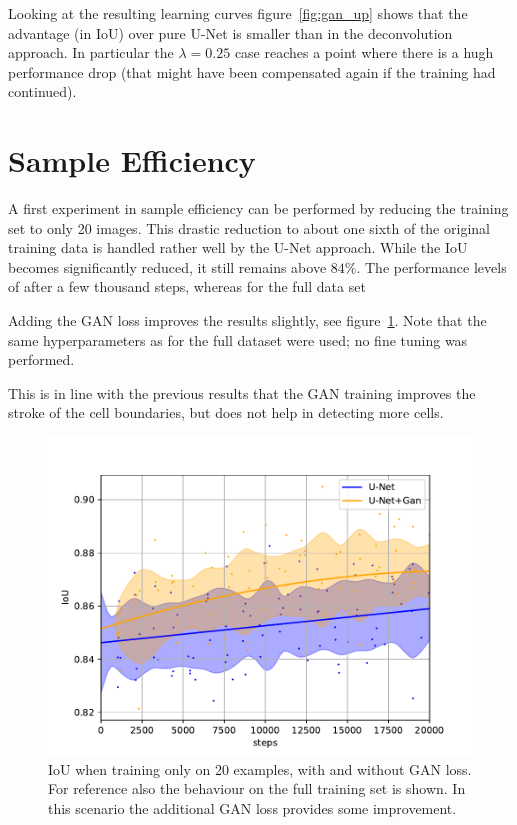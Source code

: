 \documentclass[aps,prl,twocolumn,groupedaddress,amsmath,amssymb]{revtex4-1}
\begin{document}
    Looking at the resulting learning curves figure~\ref{fig:gan_up} shows that the advantage 
    (in IoU) over pure U-Net is smaller than in the deconvolution approach. In particular the 
    $\lambda=0.25$ case reaches a point where there is a hugh performance drop (that might have been
    compensated again if the training had continued).

    \section{Sample Efficiency}

    A first experiment in sample efficiency can be performed by reducing the training set to only 20
    images. This drastic reduction to about one sixth of the original training data is handled
    rather well by the U-Net approach. While the IoU becomes significantly reduced, it still remains
    above $84\%$. The performance levels of after a few thousand steps, whereas for the full data 
    set 

    Adding the GAN loss improves the results slightly, see figure~\ref{fig:reduced_data}. Note that
    the same hyperparameters as for the full dataset were used; no fine tuning was performed. 

    This is in line with the previous results that the GAN training improves the stroke of the 
    cell boundaries, but does not help in detecting more cells.

    \begin{figure}[tbp]
        \begin{center}
        \includegraphics[width=\linewidth]{figures/less_data.pdf}
        \end{center}
        \caption{IoU when training only on 20 examples, with and without GAN loss. For reference
        also the behaviour on the full training set is shown. In this scenario the additional GAN
        loss provides some improvement.}
        \label{fig:reduced_data}
    \end{figure}
\end{document}
